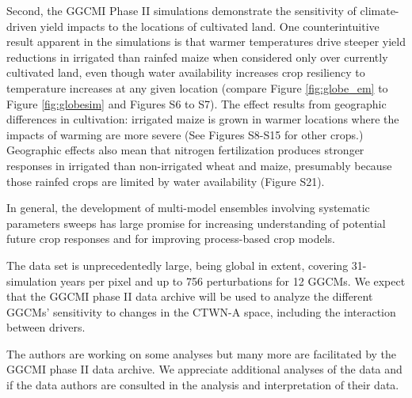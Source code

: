 \documentclass[gmd, manuscript]{copernicus} %
\begin{document}
Second, the GGCMI Phase II simulations demonstrate the sensitivity of climate-driven yield impacts to the locations of cultivated land. 
One counterintuitive result apparent in the simulations is that warmer temperatures drive steeper yield reductions in irrigated than rainfed maize when considered only over currently cultivated land, even though water availability increases crop resiliency to temperature increases at any given location (compare Figure \ref{fig:globe_em} to Figure \ref{fig:globesim} and Figures S6 to S7). 
The effect results from geographic differences in cultivation: irrigated maize is grown in warmer locations where the impacts of warming are more severe (See Figures S8-S15 for other crops.) 
Geographic effects also mean that nitrogen fertilization produces stronger responses in irrigated than non-irrigated wheat and maize, presumably because those rainfed crops are limited by water availability (Figure S21).

In general, the development of multi-model ensembles involving systematic parameters sweeps has large promise for increasing understanding of potential future crop responses and for improving process-based crop models.

The data set is unprecedentedly large, being global in extent, covering 31-simulation years per pixel and up to 756 perturbations for 12 GGCMs.
We expect that the GGCMI phase II data archive will be used to analyze the different GGCMs' sensitivity to changes in the CTWN-A space, including the interaction between drivers.
 
The authors are working on some analyses but many more are facilitated by the GGCMI phase II data archive. 
We appreciate additional analyses of the data and if the data authors are consulted in the analysis and interpretation of their data. 

\end{document}
